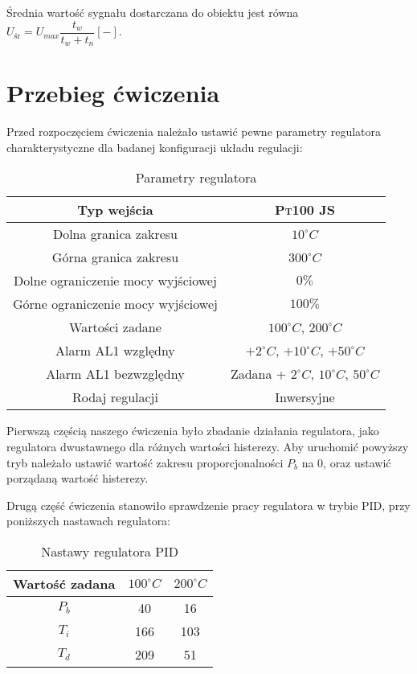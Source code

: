 \documentclass[12pt]{article}
\begin{document}
Średnia wartość sygnału dostarczana do obiektu jest równa
$U_{\text{śr}}=U_{max}\dfrac{t_w}{t_w+t_n}[-]$.

\newpage

\section{Przebieg ćwiczenia}

Przed rozpoczęciem ćwiczenia należało ustawić pewne parametry regulatora
charakterystyczne dla badanej konfiguracji układu regulacji:

\begin{table}[!htb]
	\begin{center}
		\begin{tabular}{|c|c|}
			\hline
			Typ wejścia	&	\textsc{Pt100 JS}	\\
			\hline
			Dolna granica zakresu 	&	$10^{\circ}C$	\\
			\hline
			Górna granica zakresu 	&	$300^{\circ}C$	\\
			\hline
			Dolne ograniczenie mocy wyjściowej 	&	$0\%$	\\
			\hline
			Górne ograniczenie mocy wyjściowej 	&	$100\%$	\\
			\hline
			Wartości zadane	&	$100^{\circ}C$, $200^{\circ}C$	\\
			\hline
			Alarm AL1 względny	&	$+2^{\circ}C$, $+10^{\circ}C$, $+50^{\circ}C$	\\
			\hline
			Alarm AL1 bezwzględny	&	Zadana + $2^{\circ}C$, $10^{\circ}C$,
			$50^{\circ}C$	\\
			\hline
			Rodaj regulacji	&	Inwersyjne	\\
			\hline
		\end{tabular}
	\end{center}
	\label{tab:params}
	\caption{Parametry regulatora}
\end{table}

Pierwszą częścią naszego ćwiczenia było zbadanie działania regulatora, jako regulatora 
dwustawnego dla różnych wartości histerezy. Aby uruchomić powyższy tryb należało 
ustawić wartość zakresu proporcjonalności $P_b$ na 0, oraz ustawić
porządaną wartość histerezy.

Drugą część ćwiczenia stanowiło 
sprawdzenie pracy regulatora w trybie PID, przy poniższych nastawach regulatora:

\begin{table}[!htb]
	\begin{center}
		\begin{tabular}{|c|c|c|}
			\hline
			Wartość zadana	&	$100^{\circ}C$	&	$200^{\circ}C$ \\
			\hline
			$P_b$	&	40	&	16 \\
			\hline
			$T_i$	&	166	&	103 \\
			\hline
			$T_d$	&	209	&	51 \\
			\hline
		\end{tabular}
	\end{center}
	\label{tab:nast}
	\caption{Nastawy regulatora PID}
\end{table}
\end{document}
